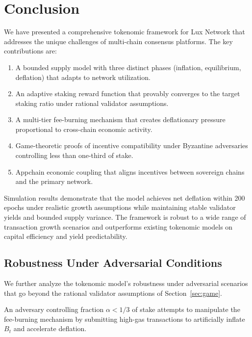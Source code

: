 \section{Conclusion}
\label{sec:conclusion}

We have presented a comprehensive tokenomic framework for Lux Network that addresses the unique challenges of multi-chain consensus platforms. The key contributions are:

\begin{enumerate}
    \item A bounded supply model with three distinct phases (inflation, equilibrium, deflation) that adapts to network utilization.
    \item An adaptive staking reward function that provably converges to the target staking ratio under rational validator assumptions.
    \item A multi-tier fee-burning mechanism that creates deflationary pressure proportional to cross-chain economic activity.
    \item Game-theoretic proofs of incentive compatibility under Byzantine adversaries controlling less than one-third of stake.
    \item Appchain economic coupling that aligns incentives between sovereign chains and the primary network.
\end{enumerate}

Simulation results demonstrate that the model achieves net deflation within 200 epochs under realistic growth assumptions while maintaining stable validator yields and bounded supply variance. The framework is robust to a wide range of transaction growth scenarios and outperforms existing tokenomic models on capital efficiency and yield predictability.

\subsection{Robustness Under Adversarial Conditions}

We further analyze the tokenomic model's robustness under adversarial scenarios that go beyond the rational validator assumptions of Section~\ref{sec:game}.

\begin{definition}
An adversary controlling fraction $\alpha < 1/3$ of stake attempts to manipulate the fee-burning mechanism by submitting high-gas transactions to artificially inflate $B_t$ and accelerate deflation.
\end{definition}

